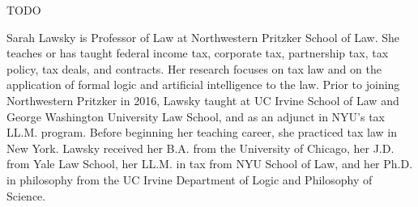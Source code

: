 \medskip



\talkabstract
TODO

\bio
Sarah Lawsky is Professor of Law at Northwestern Pritzker School of Law. She
teaches or has taught federal income tax, corporate tax, partnership tax, tax
policy, tax deals, and contracts. Her research focuses on tax law and on the
application of formal logic and artificial intelligence to the law.
%
Prior to joining Northwestern Pritzker in 2016, Lawsky taught at UC Irvine
School of Law and George Washington University Law School, and as an adjunct in
NYU’s tax LL.M. program. Before beginning her teaching career, she practiced tax
law in New York.
%
Lawsky received her B.A. from the University of Chicago, her J.D. from Yale Law
School, her LL.M. in tax from NYU School of Law, and her Ph.D. in philosophy
from the UC Irvine Department of Logic and Philosophy of Science.

\newpage
